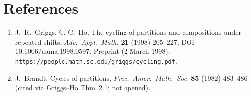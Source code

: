 \documentclass[11pt]{article}
\begin{document}
\section*{References}
\begin{enumerate}
\item J.~R.~Griggs, C.-C.~Ho, The cycling of partitions and compositions under repeated shifts, \emph{Adv.\ Appl.\ Math.} \textbf{21} (1998) 205--227, DOI 10.1006/aama.1998.0597. Preprint (2 March 1998): \texttt{https://people.math.sc.edu/griggs/cycling.pdf}.
\item J.~Brandt, Cycles of partitions, \emph{Proc.\ Amer.\ Math.\ Soc.} \textbf{85} (1982) 483--486 (cited via Griggs--Ho Thm~2.1; not opened).
\end{enumerate}
\end{document}
